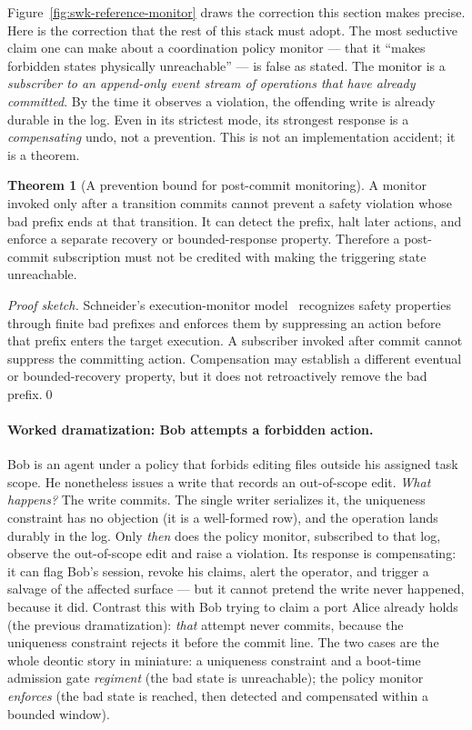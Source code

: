 \documentclass[11pt,a4paper]{article}
\theoremstyle{definition}
\newtheorem{theorem}{Theorem}[section]
\theoremstyle{remark}
\begin{document}


Figure~\ref{fig:swk-reference-monitor} draws the correction this section makes
precise. Here is the correction that the rest of this stack must adopt. The most seductive
claim one can make about a coordination policy monitor --- that it ``makes
forbidden states physically unreachable'' --- is false as stated. The monitor is a
\emph{subscriber to an append-only event stream of operations that have already
committed}. By the time it observes a violation, the offending write is already
durable in the log. Even in its strictest mode, its strongest response is a
\emph{compensating} undo, not a prevention. This is not an implementation accident;
it is a theorem.

\begin{theorem}[A prevention bound for post-commit monitoring]\label{thm:schneider}
A monitor invoked only after a transition commits cannot prevent a safety violation
whose bad prefix ends at that transition. It can detect the prefix, halt later
actions, and enforce a separate recovery or bounded-response property. Therefore a
post-commit subscription must not be credited with making the triggering state
unreachable.
\end{theorem}

\begin{proof}[Proof sketch]
Schneider's execution-monitor model~\cite{schneider2000} recognizes safety
properties through finite bad prefixes and enforces them by suppressing an action
before that prefix enters the target execution. A subscriber invoked after commit
cannot suppress the committing action. Compensation may establish a different
eventual or bounded-recovery property, but it does not retroactively remove the bad
prefix.\qed
\end{proof}

\paragraph{Worked dramatization: Bob attempts a forbidden action.}
Bob is an agent under a policy that forbids editing files outside his assigned task
scope. He nonetheless issues a write that records an out-of-scope edit. \emph{What
happens?} The write commits. The single writer serializes it, the uniqueness
constraint has no objection (it is a well-formed row), and the operation lands
durably in the log. Only \emph{then} does the policy monitor, subscribed to that
log, observe the out-of-scope edit and raise a violation. Its response is
compensating: it can flag Bob's session, revoke his claims, alert the operator, and
trigger a salvage of the affected surface --- but it cannot pretend the write never
happened, because it did. Contrast this with Bob trying to claim a port Alice
already holds (the previous dramatization): \emph{that} attempt never commits,
because the uniqueness constraint rejects it before the commit line. The two cases
are the whole deontic story in miniature: a uniqueness constraint and a boot-time
admission gate \emph{regiment} (the bad state is unreachable); the policy monitor
\emph{enforces} (the bad state is reached, then detected and compensated within a
bounded window).
\end{document}
